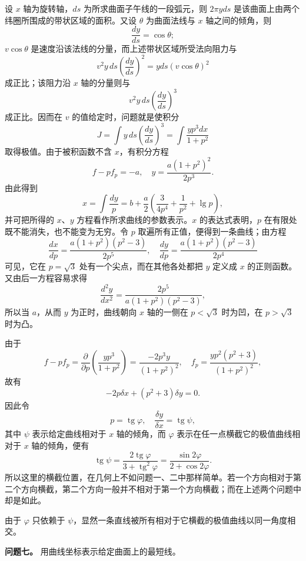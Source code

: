 \documentclass[11pt,a4paper,leqno]{article}
\begin{document}
设 $x$ 轴为旋转轴，$ds$ 为所求曲面子午线的一段弧元，则 $2\pi yds$ 是该曲面上由两个纬圈所围成的带状区域的面积。又设 $\theta$ 为曲面法线与 $x$ 轴之间的倾角，则
\[
\frac{dy}{ds}=\cos\theta;
\]
$v\cos\theta$ 是速度沿该法线的分量，而上述带状区域所受法向阻力与
\[
v^2y\,ds\left(\frac{dy}{ds}\right)^2=yds(v\cos\theta)^2
\]
成正比；该阻力沿 $x$ 轴的分量则与
\[
v^2y\,ds\left(\frac{dy}{ds}\right)^3
\]
成正比。因而在 $v$ 的值给定时，问题就是使积分
\[
J=\int y\,ds\left(\frac{dy}{ds}\right)^3=\int \frac{yp^3dx}{1+p^2}
\]
取得极值。由于被积函数不含 $x$，有积分方程
\begin{equation}\tag{17}
f-pf_p=-a,\quad y=\frac{a(1+p^2)^2}{2p^3}.
\end{equation}
由此得到
\begin{equation}\tag{17}
x=\int \frac{dy}{p}=b+\frac{a}{2}\left(\frac{3}{4p^4}+\frac{1}{p^2}+\operatorname{lg}p\right),
\end{equation}
并可把所得的 $x$、$y$ 方程看作所求曲线的参数表示。$x$ 的表达式表明，$p$ 在有限处既不能消失，也不能变为无穷。令 $p$ 取遍所有正值，便得到一条曲线；由方程
\begin{equation}\tag{18}
\frac{dx}{dp}=\frac{a(1+p^2)(p^2-3)}{2p^5},\quad
\frac{dy}{dp}=\frac{a(1+p^2)(p^2-3)}{2p^4}
\end{equation}
可见，它在 $p=\sqrt{3}$ 处有一个尖点，而在其他各处都把 $y$ 定义成 $x$ 的正则函数。又由后一方程容易求得
\[
\frac{d^2y}{dx^2}=\frac{2p^5}{a(1+p^2)(p^2-3)},
\]
所以当 $a$，从而 $y$ 为正时，曲线朝向 $x$ 轴的一侧在 $p<\sqrt{3}$ 时为凹，在 $p>\sqrt{3}$ 时为凸。

由于
\[
f-pf_p=\frac{\partial}{\partial p}\left(\frac{yp^3}{1+p^2}\right)=\frac{-2p^3y}{(1+p^2)^2},\quad
f_p=\frac{yp^2(p^2+3)}{(1+p^2)^2},
\]
故有
\[
-2p\delta x+(p^2+3)\delta y=0.
\]
因此令
\[
p=\operatorname{tg}\varphi,\quad \frac{\delta y}{\delta x}=\operatorname{tg}\psi,
\]
其中 $\psi$ 表示给定曲线相对于 $x$ 轴的倾角，而 $\varphi$ 表示在任一点横截它的极值曲线相对于 $x$ 轴的倾角，便有
\[
\operatorname{tg}\psi=\frac{2\operatorname{tg}\varphi}{3+\operatorname{tg}^2\varphi}=\frac{\sin 2\varphi}{2+\cos 2\varphi}.
\]
所以这里的横截位置，在几何上不如问题一、二中那样简单。若一个方向相对于第二个方向横截，第二个方向一般并不相对于第一个方向横截；而在上述两个问题中却是如此。

由于 $\varphi$ 只依赖于 $\psi$，显然一条直线被所有相对于它横截的极值曲线以同一角度相交。

\medskip
\noindent\textbf{问题七。} 用曲线坐标表示给定曲面上的最短线。
\end{document}

